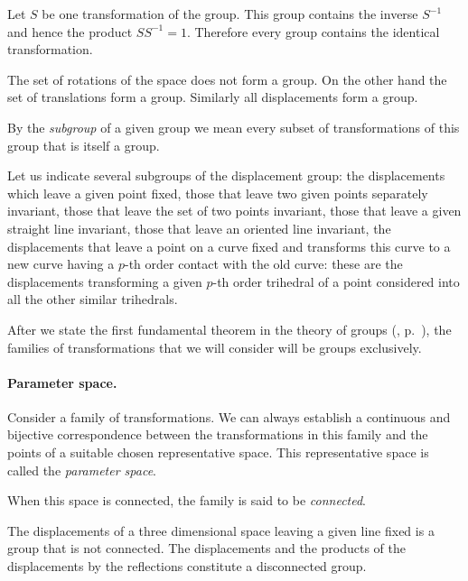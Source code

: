 \begin{rmk}
  Let $S$ be one transformation of the group. This group contains the inverse $S^{-1}$ and hence the product $SS^{-1}=1$. Therefore every group contains the identical transformation.
\end{rmk}
\begin{exs}
  The set of rotations of the space does not form a group. On the other hand the set of translations form a group. Similarly all displacements form a group.
\end{exs}

By the \emph{subgroup} of a given group we mean every subset of transformations of this group that is itself a group.

\begin{jsmall}
  Let us indicate several subgroups of the displacement group: the displacements which leave a given point fixed, those that leave two given points separately invariant, those that leave the set of two points invariant, those that leave a given straight line invariant, those that leave an oriented line invariant, the displacements that leave a point on a curve fixed and transforms this curve to a new curve having a $p$-th order contact with the old curve: these are the displacements transforming a given $p$-th order trihedral of a point considered into all the other similar trihedrals. 
\end{jsmall}

After we state the first fundamental theorem in the theory of groups (, p.~\pageref{sec:78}), the families of transformations that we will consider will be groups exclusively.

\paragraph{Parameter space.}
\label{sec:60}
Consider a family of transformations. We can always establish a continuous and bijective correspondence between the transformations in this family and the points of a suitable chosen representative space. This representative space is called the \emph{parameter space}.

When this space is connected, the family is said to be \emph{connected}.

\begin{exs}
  The displacements of a three dimensional space leaving a given line fixed is a group that is not connected. The displacements and the products of the displacements by the reflections constitute a disconnected group.
\end{exs}

